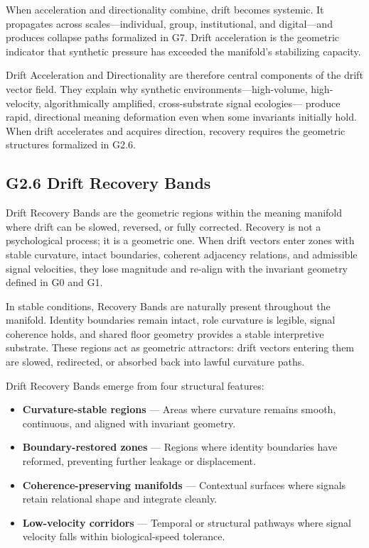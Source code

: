 \medskip

\noindent When acceleration and directionality combine, drift becomes systemic.
It propagates across scales—individual, group, institutional, and digital—and
produces collapse paths formalized in G7. Drift acceleration is the geometric
indicator that synthetic pressure has exceeded the manifold’s stabilizing
capacity.

\medskip

\noindent Drift Acceleration and Directionality are therefore central components
of the drift vector field. They explain why synthetic environments—high-volume,
high-velocity, algorithmically amplified, cross-substrate signal ecologies—
produce rapid, directional meaning deformation even when some invariants
initially hold. When drift accelerates and acquires direction, recovery requires
the geometric structures formalized in G2.6.

\subsection*{G2.6 Drift Recovery Bands}

\noindent Drift Recovery Bands are the geometric regions within the meaning
manifold where drift can be slowed, reversed, or fully corrected. Recovery is
not a psychological process; it is a geometric one. When drift vectors enter
zones with stable curvature, intact boundaries, coherent adjacency relations,
and admissible signal velocities, they lose magnitude and re-align with the
invariant geometry defined in G0 and G1.

\medskip

\noindent In stable conditions, Recovery Bands are naturally present throughout
the manifold. Identity boundaries remain intact, role curvature is legible,
signal coherence holds, and shared floor geometry provides a stable interpretive
substrate. These regions act as geometric attractors: drift vectors entering
them are slowed, redirected, or absorbed back into lawful curvature paths.

\medskip

\noindent Drift Recovery Bands emerge from four structural features:

\begin{itemize}[leftmargin=1.2cm]
    \item \textbf{Curvature-stable regions} — Areas where curvature remains
    smooth, continuous, and aligned with invariant geometry.

    \item \textbf{Boundary-restored zones} — Regions where identity boundaries
    have reformed, preventing further leakage or displacement.

    \item \textbf{Coherence-preserving manifolds} — Contextual surfaces where
    signals retain relational shape and integrate cleanly.

    \item \textbf{Low-velocity corridors} — Temporal or structural pathways
    where signal velocity falls within biological-speed tolerance.
\end{itemize}


